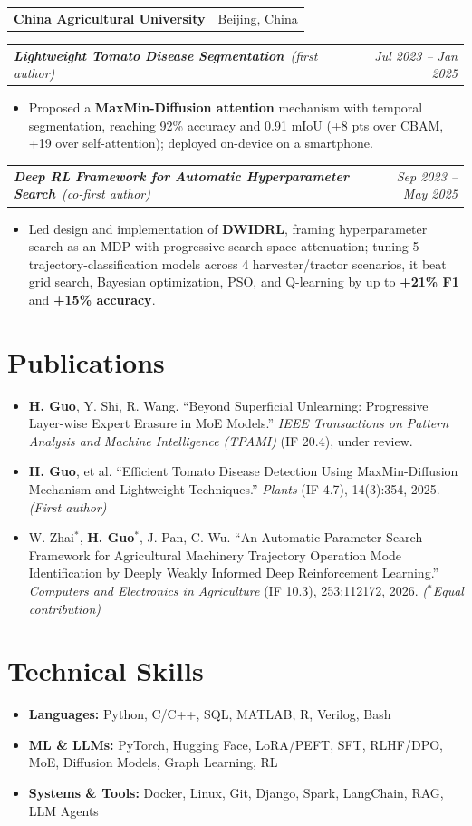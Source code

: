 \documentclass[10pt, letterpaper]{article}
\makeatletter
\newcommand{\inst}[2]{%
    \noindent
    \begin{tabularx}{\textwidth}{@{}>{\raggedright\arraybackslash}X r@{}}
        \textbf{#1} & #2
    \end{tabularx}\par\vspace{-1pt}%
}
\newcommand{\proj}[3]{%
    \noindent
    \begin{tabularx}{\textwidth}{@{}>{\raggedright\arraybackslash}X r@{}}
        \hspace{0.6em}\textbf{\textit{#1}}\ \textit{#2} & \textit{#3}
    \end{tabularx}\par\vspace{-1pt}%
}
\makeatother
\begin{document}
\inst{China Agricultural University}{Beijing, China}
\proj{Lightweight Tomato Disease Segmentation}{(first author)}{Jul 2023 -- Jan 2025}
\begin{itemize}[leftmargin=2em]
    \item Proposed a \textbf{MaxMin-Diffusion attention} mechanism with temporal segmentation, reaching 92\% accuracy and
          0.91 mIoU (+8 pts over CBAM, +19 over self-attention); deployed on-device on a smartphone.
\end{itemize}
\proj{Deep RL Framework for Automatic Hyperparameter Search}{(co-first author)}{Sep 2023 -- May 2025}
\begin{itemize}[leftmargin=2em]
    \item Led design and implementation of \textbf{DWIDRL}, framing hyperparameter search as an MDP with progressive
          search-space attenuation; tuning 5 trajectory-classification models across 4 harvester/tractor scenarios, it beat
          grid search, Bayesian optimization, PSO, and Q-learning by up to \textbf{+21\% F1} and \textbf{+15\% accuracy}.
\end{itemize}

\section{Publications}
\begin{itemize}[leftmargin=1.3em]
    \item \textbf{H. Guo}, Y. Shi, R. Wang. ``Beyond Superficial Unlearning: Progressive Layer-wise Expert Erasure in
          MoE Models.'' \textit{IEEE Transactions on Pattern Analysis and Machine Intelligence (TPAMI)} (IF 20.4), under review.
    \item \textbf{H. Guo}, et al. ``Efficient Tomato Disease Detection Using MaxMin-Diffusion Mechanism and Lightweight
          Techniques.'' \textit{Plants} (IF 4.7), 14(3):354, 2025. \textit{(First author)}
    \item W. Zhai$^*$, \textbf{H. Guo}$^*$, J. Pan, C. Wu. ``An Automatic Parameter Search Framework for Agricultural
          Machinery Trajectory Operation Mode Identification by Deeply Weakly Informed Deep Reinforcement Learning.''
          \textit{Computers and Electronics in Agriculture} (IF 10.3), 253:112172, 2026. \textit{($^*$Equal contribution)}
\end{itemize}

\section{Technical Skills}
\begin{itemize}[leftmargin=1.3em]
    \item \textbf{Languages:} Python, C/C++, SQL, MATLAB, R, Verilog, Bash
    \item \textbf{ML \& LLMs:} PyTorch, Hugging Face, LoRA/PEFT, SFT, RLHF/DPO, MoE, Diffusion Models, Graph Learning, RL
    \item \textbf{Systems \& Tools:} Docker, Linux, Git, Django, Spark, LangChain, RAG, LLM Agents
\end{itemize}
\end{document}
